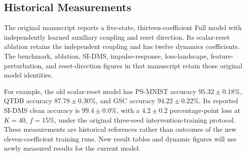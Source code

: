 \documentclass[letterpaper]{article}
\begin{document}
\subsection{Historical Measurements}

The original manuscript reports a five-state, thirteen-coefficient Full model with independently learned auxiliary coupling and reset direction. Its scalar-reset ablation retains the independent coupling and has twelve dynamics coefficients. The benchmark, ablation, SI-DMS, impulse-response, loss-landscape, feature-perturbation, and reset-direction figures in that manuscript retain those original model identities.

For example, the old scalar-reset model has PS-MNIST accuracy $95.32\pm0.18\%$, QTDB accuracy $87.78\pm0.30\%$, and GSC accuracy $94.22\pm0.22\%$. Its reported SI-DMS clean accuracy is $99.4\pm0.0\%$, with a $4.2\pm0.2$ percentage-point loss at $K=40$, $f=15\%$, under the original three-seed intervention-training protocol. These measurements are historical references rather than outcomes of the new eleven-coefficient training runs. New result tables and dynamic figures will use newly measured results for the current model.


\end{document}
